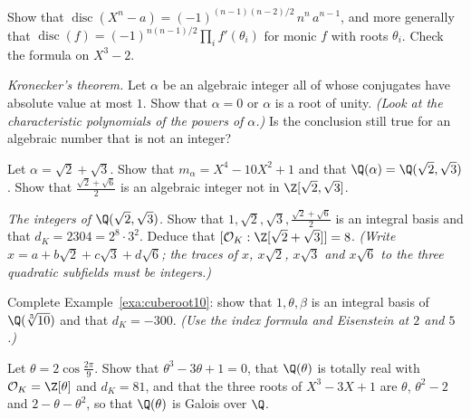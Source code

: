 \begin{exercise}[$\star\star$]\label{ex:discbinom}
Show that $\operatorname{disc}(X^n-a)=(-1)^{(n-1)(n-2)/2}\,n^n\,a^{n-1}$, and more generally that
$\operatorname{disc}(f)=(-1)^{n(n-1)/2}\prod_if'(\theta_i)$ for monic $f$ with roots $\theta_i$. Check the formula on
$X^3-2$.
\end{exercise}

\begin{exercise}[$\star\star$]\label{ex:kronecker}
\emph{Kronecker's theorem.} Let $\alpha$ be an algebraic integer all of whose conjugates have absolute value at most $1$.
Show that $\alpha=0$ or $\alpha$ is a root of unity. \emph{(Look at the characteristic polynomials of the powers of
$\alpha$.)} Is the conclusion still true for an algebraic number that is not an integer?
\end{exercise}

\begin{exercise}[$\star\star$]\label{ex:sqrt23}
Let $\alpha=\sqrt2+\sqrt3$. Show that $m_\alpha=X^4-10X^2+1$ and that $\Q(\alpha)=\Q(\sqrt2,\sqrt3)$. Show that
$\frac{\sqrt2+\sqrt6}2$ is an algebraic integer not in $\Z[\sqrt2,\sqrt3]$.
\end{exercise}

\begin{exercise}[$\star\star$]\label{ex:biquadratic}
\emph{The integers of $\Q(\sqrt2,\sqrt3)$.} Show that $1,\sqrt2,\sqrt3,\frac{\sqrt2+\sqrt6}2$ is an integral basis and
that $d_K=2304=2^8\cdot3^2$. Deduce that $[\mathcal O_K:\Z[\sqrt2+\sqrt3]]=8$. \emph{(Write $x=a+b\sqrt2+c\sqrt3+
d\sqrt6$; the traces of $x$, $x\sqrt2$, $x\sqrt3$ and $x\sqrt6$ to the three quadratic subfields must be integers.)}
\end{exercise}

\begin{exercise}[$\star\star$]\label{ex:cuberoot10}
Complete Example~\ref{exa:cuberoot10}: show that $1,\theta,\beta$ is an integral basis of $\Q(\sqrt[3]{10})$ and that
$d_K=-300$. \emph{(Use the index formula and Eisenstein at $2$ and $5$.)}
\end{exercise}

\begin{exercise}[$\star\star$]\label{ex:totallyreal}
Let $\theta=2\cos\frac{2\pi}9$. Show that $\theta^3-3\theta+1=0$, that $\Q(\theta)$ is totally real with
$\mathcal O_K=\Z[\theta]$ and $d_K=81$, and that the three roots of $X^3-3X+1$ are $\theta$, $\theta^2-2$ and
$2-\theta-\theta^2$, so that $\Q(\theta)$ is Galois over $\Q$.
\end{exercise}

